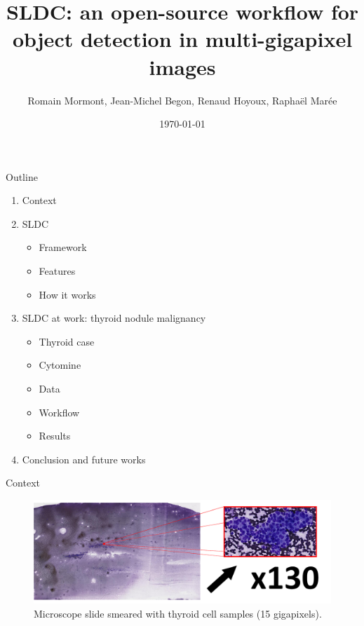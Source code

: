 \documentclass{beamer}
\title{{\bf SLDC: an open-source workflow for object detection in multi-gigapixel images}}
\author{Romain Mormont, Jean-Michel Begon, Renaud Hoyoux, Raphaël Marée}
\institute{Montefiore Institute, University of Liège, Belgium}
\date{\today}
\begin{document}
\renewcommand{\inserttotalframenumber}{20}


\begin{frame}
\titlepage
\end{frame}

\begin{frame}{Outline}

	\begin{enumerate}

		\item Context
		
		\item SLDC
		\begin{itemize}
			\item Framework
			\item Features
			\item How it works
		\end{itemize}

		\item SLDC at work: thyroid nodule malignancy
		\begin{itemize}
			\item Thyroid case
			\item Cytomine
			\item Data
			\item Workflow
			\item Results
		\end{itemize}
		
		\item Conclusion and future works
		
	\end{enumerate}

\end{frame}


\begin{frame}{Context}
	\vfill
	\begin{figure}[h]
	\center
	\includegraphics[scale=0.19]{images/whole-slide-dim.png}
	\caption{Microscope slide smeared with thyroid cell samples (15 gigapixels).}
	\end{figure}
	\vfill
\end{frame}
\end{document}
